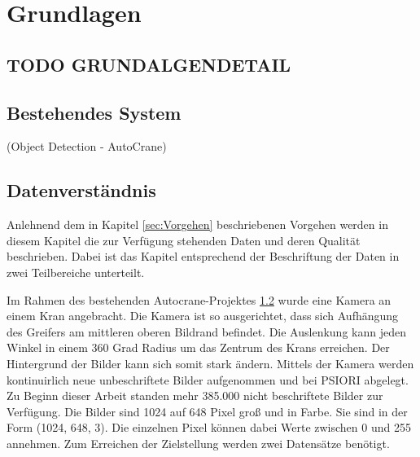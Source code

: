 \listoftodos



\chapter{Grundlagen}
\label{chap:Grundlagen}

	\section{TODO GRUNDALGENDETAIL}
	\label{sec:TODOGrundlagenDetail}
	\section{Bestehendes System}
	\label{sec:BestehendesSystem}
			(Object Detection - AutoCrane)

	\section{Datenverständnis}
	\label{sec:DataUnderstanding}
	Anlehnend dem in Kapitel \ref{sec:Vorgehen} beschriebenen Vorgehen  werden in diesem Kapitel die zur Verfügung stehenden Daten und deren Qualität beschrieben. Dabei ist das Kapitel entsprechend der Beschriftung der Daten in zwei Teilbereiche unterteilt.
	
	Im Rahmen des bestehenden Autocrane-Projektes \ref{sec:BestehendesSystem}  wurde eine Kamera an einem Kran angebracht. Die Kamera ist so ausgerichtet, dass sich Aufhängung des Greifers am mittleren oberen Bildrand befindet. Die Auslenkung kann jeden Winkel in einem 360 Grad Radius um das Zentrum des Krans erreichen. Der Hintergrund der Bilder kann sich somit stark ändern. Mittels der Kamera werden kontinuirlich neue unbeschriftete Bilder aufgenommen und bei PSIORI abgelegt. Zu Beginn dieser Arbeit standen mehr 385.000 nicht beschriftete Bilder zur Verfügung. Die Bilder sind 1024 auf 648 Pixel groß und in Farbe. Sie sind in der Form (1024, 648, 3). Die einzelnen Pixel können dabei Werte zwischen 0 und 255 annehmen. 
	Zum Erreichen der Zielstellung werden zwei Datensätze benötigt.
	
